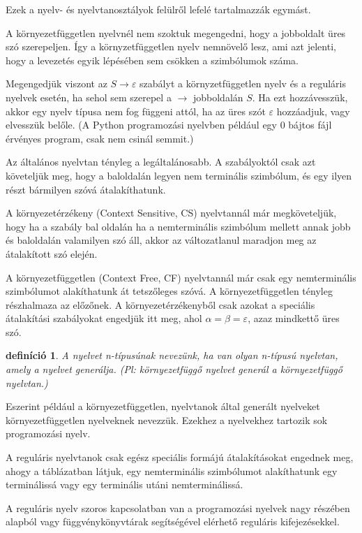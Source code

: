 \documentclass[a4paper]{article}
\newtheorem{definicio}{definíció}[section]
\begin{document}
Ezek a nyelv- és nyelvtanosztályok felülről lefelé tartalmazzák egymást.

A környezetfüggetlen nyelvnél nem szoktuk megengedni, hogy a jobboldalt
üres szó szerepeljen. Így a környzetfüggetlen nyelv nemnövelő lesz, ami
azt jelenti, hogy a levezetés egyik lépésében sem csökken a szimbólumok
száma.

Megengedjük viszont az $S\to \varepsilon$ szabályt a környzetfüggetlen
nyelv és a reguláris nyelvek esetén, ha sehol sem szerepel a $\to$
jobboldalán $S$. Ha ezt hozzávesszük, akkor egy nyelv típusa nem fog
függeni attól, ha az üres szót $\varepsilon$ hozzáadjuk, vagy elvesszük
belőle. (A Python programozási nyelvben például egy 0 bájtos fájl
érvényes program, csak nem csinál semmit.)

Az általános nyelvtan tényleg a legáltalánosabb. A
szabályoktól csak azt követeljük meg, hogy a baloldalán legyen nem
terminális szimbólum, és egy ilyen részt bármilyen szóvá átalakíthatunk.

A környezetérzékeny (Context Sensitive, CS) nyelvtannál már
megköveteljük, hogy ha a szabály bal oldalán ha a nemterminális
szimbólum mellett annak jobb és baloldalán valamilyen szó áll, akkor az
változatlanul maradjon meg az átalakított szó elején.

A környezetfüggetlen (Context Free, CF) nyelvtannál már csak
egy nemterminális szimbólumot alakíthatunk át tetszőleges szóvá. A
környezetfüggetlen tényleg részhalmaza az előzőnek.  A
környezetérzékenyből csak azokat a speciális átalakítási szabályokat
engedjük itt meg, ahol $\alpha=\beta=\varepsilon$, azaz mindkettő üres
szó.


\begin{definicio}
A nyelvet n-típusúnak nevezünk, ha van olyan n-típusú
nyelvtan, amely a nyelvet generálja. (Pl: környezetfüggő nyelvet generál
a környezetfüggő nyelvtan.)
\end{definicio}

Eszerint például a környezetfüggetlen, nyelvtanok által generált
nyelveket környezetfüggetlen nyelveknek nevezzük. Ezekhez a nyelvekhez
tartozik sok programozási nyelv.

A reguláris nyelvtanok csak egész speciális formájú átalakításokat
engednek meg, ahogy a táblázatban látjuk, egy nemterminális szimbólumot
alakíthatunk egy terminálissá vagy egy terminális utáni nemterminálissá.

A reguláris nyelv szoros kapcsolatban van a programozási nyelvek nagy
részében alapból vagy függvénykönyvtárak segítségével elérhető reguláris
kifejezésekkel.
\end{document}
